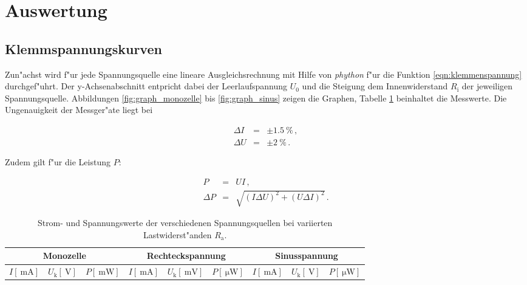 \section{Auswertung}
\label{sec:auswertung}

	\subsection{Klemmspannungskurven}
	\label{subsec:kurven}
		Zun"achst wird f"ur jede Spannungsquelle eine lineare Ausgleichsrechnung mit Hilfe von \emph{phython} f"ur die Funktion \eqref{eqn:klemmenspannung} durchgef"uhrt.
		Der y-Achsenabschnitt entpricht dabei der Leerlaufspannung $U_0$ und die Steigung dem Innenwiderstand $R_\mathrm{i}$ der jeweiligen Spannungsquelle.
		Abbildungen \ref{fig:graph_monozelle} bis \ref{fig:graph_sinus} zeigen die Graphen, Tabelle \ref{table:monozelle} beinhaltet die Messwerte.
		Die Ungenauigkeit der Messger"ate liegt bei

		\begin{eqnarray*}
			\Delta I & = & \pm \SI{1.5}{\percent} \,, \\
			\Delta U & = & \pm \SI{2}{\percent} \,.
		\end{eqnarray*}

		Zudem gilt f"ur die Leistung $P$:

		\begin{eqnarray*}
			P & = & UI \,, \\
			\Delta P & = & \sqrt{(I \Delta U)^2 + (U \Delta I)^2} \,. 
		\end{eqnarray*}

		\begin{table}[h!]
			\begin{center}
				\caption{Strom- und Spannungswerte der verschiedenen Spannungsquellen bei variierten Lastwiderst"anden $R_\mathrm{a}$. \label{table:monozelle}}
				\begin{tabular}{|c|c|r||c|c|r||c|c|r|}
					\hline
						\multicolumn{3}{|c||}{Monozelle} & \multicolumn{3}{c||}{Rechteckspannung} & \multicolumn{3}{c|}{Sinusspannung} \\
					\hline
						$I [\SI{}{\milli \ampere}]$ & $U_\mathrm{k} [\SI{}{\volt}]$ & $P [\SI{}{\milli \watt}]$ &
						$I [\SI{}{\milli \ampere}]$ & $U_\mathrm{k} [\SI{}{\milli \volt}]$ & $P [\SI{}{\micro \watt}]$ &
						$I [\SI{}{\milli \ampere}]$ & $U_\mathrm{k} [\SI{}{\volt}]$ & $P [\SI{}{\micro \watt}]$\\
					\hline 
					\hline
						
					\hline 
				\end{tabular}
			\end{center}
		\end{table}

